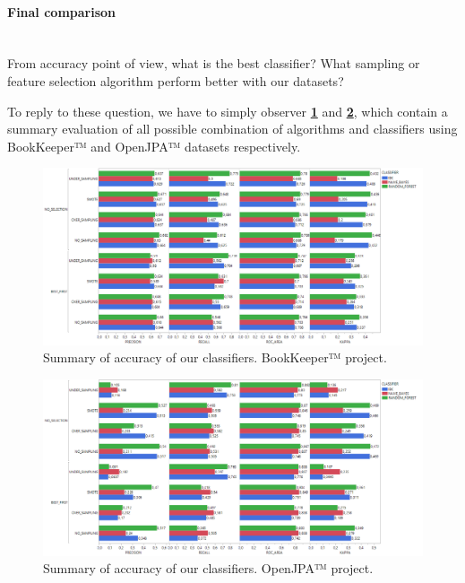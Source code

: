 \documentclass[sigconf]{acmart}
\begin{document}
\paragraph{Final comparison} 
\hfill\\
From accuracy point of view, what is the best classifier? What sampling or feature selection algorithm perform better with our datasets?

To reply to these question, we have to simply observer \textbf{\cref{BOOKKEEPER-Total}} and \textbf{\cref{OPENJPA-Total}}, which contain a summary evaluation of all possible combination of algorithms and classifiers using BookKeeper™ and OpenJPA™ datasets respectively.

\begin{figure}[h!]
  \centering
  \includegraphics[width=\textwidth]{./BOOKKEEPER/Total.png}
  \caption{Summary of accuracy of our classifiers. \newline BookKeeper™ project. \newline}
  \label{BOOKKEEPER-Total}
\end{figure}

\begin{figure}[h!]
  \centering
  \includegraphics[width=\textwidth]{./OPENJPA/Total.png}
  \caption{Summary of accuracy of our classifiers. \newline OpenJPA™ project. \newline\newline\newline\newline\newline}
  \label{OPENJPA-Total}
\end{figure}






\FloatBarrier
\end{document}
